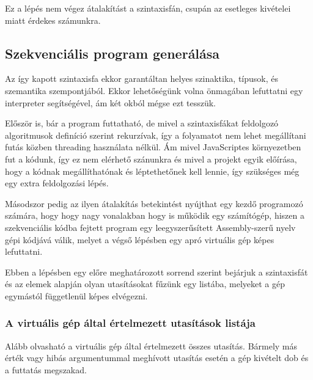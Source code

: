 Ez a lépés nem végez átalakítást a szintaxisfán, csupán az esetleges kivételei miatt érdekes számunkra.

\subsection{Szekvenciális program generálása}

Az így kapott szintaxisfa ekkor garantáltan helyes szinaktika, típusok, és szemantika szempontjából. Ekkor lehetőségünk volna önmagában lefuttatni egy interpreter segítségével, ám két okból mégse ezt tesszük.

Először is, bár a program futtatható, de mivel a szintaxisfákat feldolgozó algoritmusok definíció szerint rekurzívak, így a folyamatot nem lehet megállítani futás közben threading használata nélkül. Ám mivel JavaScriptes környezetben fut a kódunk, így ez nem elérhető szánunkra és mivel a projekt egyik előírása, hogy a kódnak megállíthatónak és léptethetőnek kell lennie, így szükséges még egy extra feldolgozási lépés.

Másodszor pedig az ilyen átalakítás betekintést nyújthat egy kezdő programozó számára, hogy hogy nagy vonalakban hogy is működik egy számítógép, hiszen a szekvenciális kódba fejtett program egy leegyszerűsített Assembly-szerű nyelv gépi kódjává válik, melyet a végső lépésben egy apró virtuális gép képes lefuttatni.

Ebben a lépésben egy előre meghatározott sorrend szerint bejárjuk a szintaxisfát és az elemek alapján olyan utasításokat fűzünk egy listába, melyeket a gép egymástól függetlenül képes elvégezni.

\subsubsection{A virtuális gép által értelmezett utasítások listája}
\label{sec:vminsts}

Alább olvasható a virtuális gép által értelmezett összes utasítás. Bármely más érték vagy hibás argumentummal meghívott utasítás esetén a gép kivételt dob és a futtatás megszakad.

\newcommand{\codetable}[3]{
    \begin{center}
        \captionof{table}{#1\label{#2}}
        \begin{tabularx}{\textwidth}{ l l X }
            \hline
            \multicolumn{1}{c}{\bfseries{Utasítás}} &
            \multicolumn{1}{c}{\bfseries{Paraméter}} &
            \multicolumn{1}{c}{\bfseries{Leírás}} \\
            \hline
            #3
            \hline
        \end{tabularx}
    \end{center}
}

